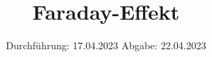 

\subject{VERSUCH 46}
\title{Faraday-Effekt}
\date{%
  Durchführung: 17.04.2023
  \hspace{3em}
  Abgabe: 22.04.2023
}



\maketitle
\thispagestyle{empty}
\tableofcontents
\newpage







\printbibliography{}


